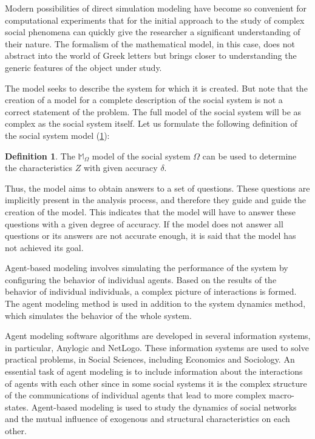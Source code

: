 \documentclass[12pt]{report}
\theoremstyle{definition}
\newtheorem{defn}{Definition}[section]
\begin{document}
Modern possibilities of direct simulation modeling have become so convenient for computational experiments that for the initial approach to the study of complex social phenomena can quickly give the researcher a significant understanding of their nature. The formalism of the mathematical model, in this case, does not abstract into the world of Greek letters but brings closer to understanding the generic features of the object under study.

The model seeks to describe the system for which it is created. 
But note that the creation of a model for a complete description of the social system is not a correct statement of the problem. 
The full model of the social system will be as complex as the social system itself. 
Let us formulate the following definition of the social system model (\ref{defi:so1}):

\begin{defn}
	\label{defi:so1}
The $\mathbb{M}_{\Omega}$ model of the social system $\Omega$ can be used to determine the characteristics $Z$ with given accuracy $\delta$.
\end{defn}

Thus, the model aims to obtain answers to a set of questions. 
These questions are implicitly present in the analysis process, and therefore they guide and guide the creation of the model. This indicates that the model will have to answer these questions with a given degree of accuracy.
If the model does not answer all questions or its answers are not accurate enough, it is said that the model has not achieved its goal.

Agent-based modeling involves simulating the performance of the system by configuring the behavior of individual agents. 
Based on the results of the behavior of individual individuals, a complex picture of interactions is formed.
The agent modeling method is used in addition to the system dynamics method, which simulates the behavior of the whole system.

Agent modeling software algorithms are developed in several information systems, in particular, Anylogic and NetLogo.
These information systems are used to solve practical problems,  in Social Sciences, including Economics and Sociology. 
An essential task of agent modeling is to include information about the interactions of agents with each other since in some social systems it is the complex structure of the communications of individual agents that lead to more complex macro-states. 
Agent-based modeling is used to study the dynamics of social networks and the mutual influence of exogenous and structural characteristics on each other.
\end{document}

